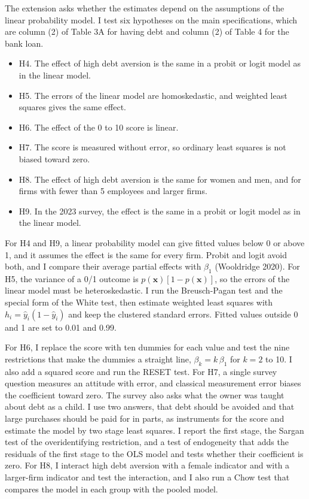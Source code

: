 \documentclass[preprint,letterpaper,11pt,authoryear]{elsarticle}
\begin{document}
The extension asks whether the estimates depend on the assumptions of the linear probability model. I test six hypotheses on the main specifications, which are column (2) of Table 3A for having debt and column (2) of Table 4 for the bank loan.
\begin{itemize}
\item H4. The effect of high debt aversion is the same in a probit or logit model as in the linear model.
\item H5. The errors of the linear model are homoskedastic, and weighted least squares gives the same effect.
\item H6. The effect of the 0 to 10 score is linear.
\item H7. The score is measured without error, so ordinary least squares is not biased toward zero.
\item H8. The effect of high debt aversion is the same for women and men, and for firms with fewer than 5 employees and larger firms.
\item H9. In the 2023 survey, the effect is the same in a probit or logit model as in the linear model.
\end{itemize}

For H4 and H9, a linear probability model can give fitted values below 0 or above 1, and it assumes the effect is the same for every firm. Probit and logit avoid both, and I compare their average partial effects with $\beta_1$ (Wooldridge 2020). For H5, the variance of a 0/1 outcome is $p(\mathbf{x})[1 - p(\mathbf{x})]$, so the errors of the linear model must be heteroskedastic. I run the Breusch-Pagan test and the special form of the White test, then estimate weighted least squares with $h_i = \hat{y}_i(1 - \hat{y}_i)$ and keep the clustered standard errors. Fitted values outside 0 and 1 are set to 0.01 and 0.99.

For H6, I replace the score with ten dummies for each value and test the nine restrictions that make the dummies a straight line, $\beta_k = k\,\beta_1$ for $k = 2$ to 10. I also add a squared score and run the RESET test. For H7, a single survey question measures an attitude with error, and classical measurement error biases the coefficient toward zero. The survey also asks what the owner was taught about debt as a child. I use two answers, that debt should be avoided and that large purchases should be paid for in parts, as instruments for the score and estimate the model by two stage least squares. I report the first stage, the Sargan test of the overidentifying restriction, and a test of endogeneity that adds the residuals of the first stage to the OLS model and tests whether their coefficient is zero. For H8, I interact high debt aversion with a female indicator and with a larger-firm indicator and test the interaction, and I also run a Chow test that compares the model in each group with the pooled model.
\end{document}
